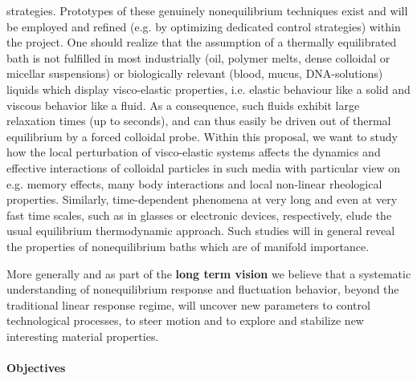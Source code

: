 strategies. Prototypes of these genuinely nonequilibrium techniques exist and will be
employed and refined (e.g. by optimizing dedicated control strategies) within the project.
One should realize that the assumption of a thermally equilibrated bath is not fulfilled in
most industrially (oil, polymer melts, dense colloidal or micellar suspensions) or
biologically relevant (blood, mucus, DNA-solutions) liquids which display visco-elastic
properties, i.e. elastic behaviour like a solid and viscous behavior like a fluid. As a
consequence, such fluids exhibit large relaxation times (up to seconds), and can thus easily
be driven out of thermal equilibrium by a forced colloidal probe. Within this proposal, we
want to study how the local perturbation of visco-elastic systems affects the dynamics and
effective interactions of colloidal particles in such media with particular view on
e.g. memory effects, many body interactions and local non-linear rheological properties.
Similarly, time-dependent phenomena at very long and even at very fast time scales, such as
in glasses or electronic devices, respectively, elude the usual equilibrium thermodynamic
approach.  Such studies will in general reveal the properties of nonequilibrium baths which
are of manifold importance.

More generally and as part of the {\bf long term vision} we believe that a systematic
understanding of nonequilibrium response and fluctuation behavior, beyond the traditional
linear response regime, will uncover new parameters to control technological processes, to
steer motion and to explore and stabilize new interesting material properties.

\paragraph{Objectives}


